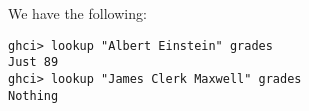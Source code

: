 
We have the following:
\scriptsize\begin{verbatim}
ghci> lookup "Albert Einstein" grades
Just 89
ghci> lookup "James Clerk Maxwell" grades
Nothing
\end{verbatim}\normalsize
